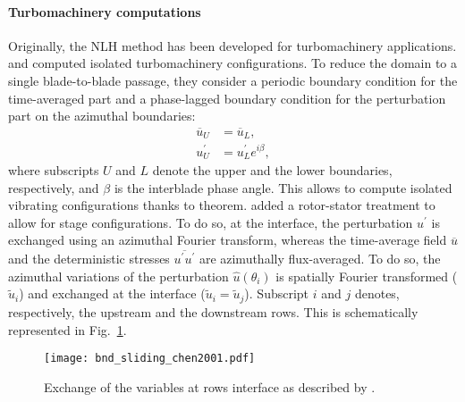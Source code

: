 \paragraph{Turbomachinery computations}
Originally, the NLH method has been developed for 
turbomachinery applications. \citet{He1998} and
\citet{Ning1998} computed isolated turbomachinery
configurations. To reduce the domain to a single 
blade-to-blade passage, they consider a periodic
boundary condition for the time-averaged part and a
phase-lagged boundary condition for the perturbation part on the
azimuthal boundaries:
\begin{equation}
    \begin{split}
    	\overline{u}_U &= \overline{u}_L, \\
    	u^\prime_U &= u^\prime_L e^{i \beta},
    \end{split}
\end{equation}
where subscripts $U$ and $L$ denote 
the upper and the lower boundaries, respectively, and $\beta$ is the
interblade phase angle. This allows to compute
isolated vibrating configurations thanks to 
\citet{Lane1956} theorem.
\citet{Chen2001} added a rotor-stator treatment
to allow for stage configurations. 
To do so, at the interface, the perturbation 
$u^\prime$ is exchanged using
an azimuthal Fourier transform, whereas
the time-average field $\overline{u}$ 
and the deterministic stresses 
$\overline{u^\prime u^\prime}$
are azimuthally flux-averaged.
To do so, the azimuthal variations of 
the perturbation $\widehat{u} (\theta_i)$
is spatially Fourier transformed ($\widetilde{u}_i$)
and exchanged at the interface 
($\widetilde{u}_i = \widetilde{u}_j$). Subscript $i$ and $j$ denotes,
respectively, the upstream and the downstream rows.
This is schematically represented in 
Fig.~\ref{fig:bnd_sliding_chen2001}.
\begin{figure}[htbp]
  \centering
  \texttt{[image: bnd\_sliding\_chen2001.pdf]}
  \caption{Exchange of the variables at rows interface as described by \citet{Chen2001}.}
  \label{fig:bnd_sliding_chen2001}
\end{figure}


